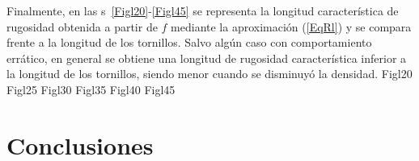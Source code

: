 \documentclass[a4paper]{article}
\begin{document}
Finalmente, en las \figurename{s}~\ref{Figl20}-\ref{Figl45} se representa la
longitud característica de rugosidad obtenida a partir de $f$ mediante la
aproximación (\ref{EqRl}) y se compara frente a la longitud de los tornillos.
Salvo algún caso con comportamiento errático, en general se obtiene una
longitud de rugosidad característica inferior a la longitud de los tornillos,
siendo menor cuando se disminuyó la densidad.
{Figl20}
{Figl25}
{Figl30}
{Figl35}
{Figl40}
{Figl45}

\section{Conclusiones}
\end{document}
